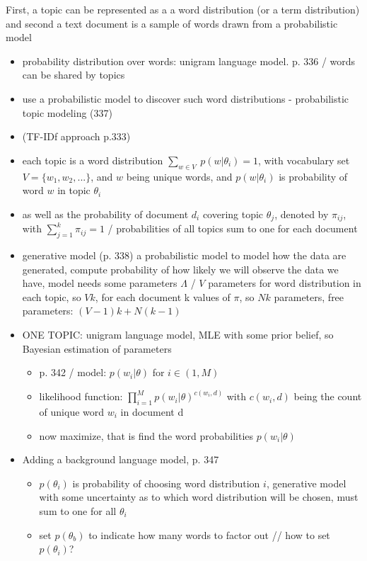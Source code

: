 \documentclass[11pt,a4paper,english,oneside]{book}
\numberwithin{equation}{chapter}
\begin{document}
First, a topic can be represented as a a word distribution (or a term distribution) and second a text document is a sample of words drawn from a probabilistic model 
\begin{itemize}
	\item probability distribution over words: unigram language model. p. 336 / words can be shared by topics 
	\item use a probabilistic model to discover such word  distributions - probabilistic topic modeling (337) 
	\item (TF-IDf approach p.333)
	\item each topic is a word distribution $\underset{w \in V}{\sum} \ p(w | \theta_i) = 1$, with vocabulary set $V = \{w_1, w_2, ...\} $, and $w$ being unique words, and $p(w | \theta_i)$ is probability of word $w$ in topic $\theta_i$
	\item as well as the probability of document $d_i$ covering topic $\theta_j$, denoted by $\pi_{ij}$, with $\sum_{j=1}^{k}\pi_{ij} = 1$ / probabilities of all topics sum to one for each document
	\item generative model (p. 338) a probabilistic model to model how the data are generated, compute probability of how likely we will observe the data we have, model needs some parameters $\Lambda$ / $V$ parameters for word distribution in each topic, so $Vk$, for each document k values of $\pi$, so $Nk$ parameters, free parameters: $(V-1)k + N(k-1)$
	\item ONE TOPIC: unigram language model, MLE with some prior belief, so Bayesian estimation of parameters
	\begin{itemize}
		\item p. 342 / model: $p(w_i | \theta)$ for $ i \in (1, M)$
		\item likelihood function: $\prod_{i = 1}^{M} p(w_i | \theta)^{c(w_i, d)}$ with $c(w_i, d)$ being the count of unique word $w_i$ in document d
		\item now maximize, that is find the word probabilities $p(w_i | \theta)$
	\end{itemize}
	\item Adding a background language model, p. 347
	\begin{itemize}
		\item $p(\theta_i)$ is probability of choosing word distribution $i$, generative model with some uncertainty as to which word distribution will be chosen, must sum to one for all $\theta_i$
		\item set $p(\theta_b)$ to indicate how many words to factor out // how to set $p(\theta_i)$?

\end{itemize}
\end{itemize}
\end{document}

